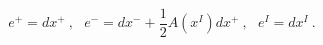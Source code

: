 \begin{equation}
e^+ = dx^+ ~,~~~
e^- = dx^- + \frac{1}{2} A(x^I) dx^+ ~,~~~
e^I = dx^I ~.
\label{pp}
\end{equation}

